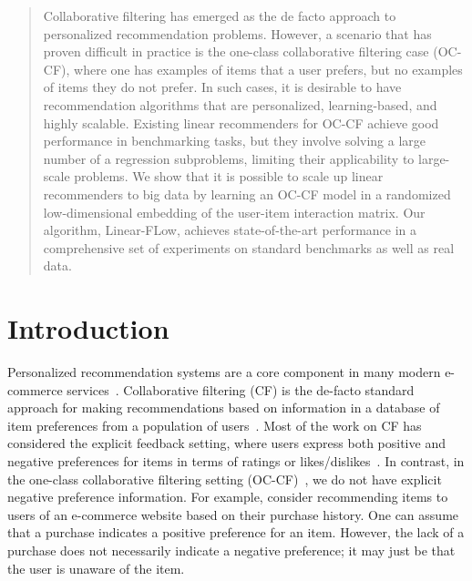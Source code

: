 \documentclass{article}
\newcommand{\citep}{\cite}
\begin{document}
\maketitle
\begin{abstract}
Collaborative filtering has emerged as the de facto approach to personalized recommendation problems. However, a scenario that has proven difficult in practice is the
one-class collaborative filtering case (OC-CF), where one has examples of items that a user prefers, but no examples of items they do not prefer. In such cases, it is desirable to have recommendation algorithms that are personalized, learning-based, and highly scalable. Existing linear recommenders for OC-CF achieve good performance in benchmarking tasks, but they involve solving a large number of a regression subproblems, limiting their applicability to large-scale problems. We show that it is possible to scale up linear recommenders to big data by learning an OC-CF model in a randomized low-dimensional embedding of the user-item interaction matrix. Our algorithm, Linear-FLow, achieves state-of-the-art performance in a comprehensive set of experiments on standard benchmarks as well as real data.

\end{abstract}



\section{Introduction}
Personalized recommendation systems are a core component
in many modern e-commerce services~\citep{Leavitt:2006}. Collaborative
filtering (CF) is the de-facto standard approach for making recommendations
based on information in a database
of item preferences from a population of users~\citep{Goldberg:1992,Sarwar:2001}. Most of the work on CF has considered
the explicit feedback
setting, where users express both positive and negative preferences
for items in terms of ratings or likes/dislikes~\citep{koren2009matrix}. In
contrast, in the one-class collaborative filtering setting (OC-CF)~\citep{Pan:2008}, we do not have
explicit negative preference information. For example, consider
recommending items to users of an e-commerce website
based on their purchase history. One can assume that a
purchase indicates a positive preference for an item. However,
the lack of a purchase does not necessarily indicate
a negative preference; it may just be that the user is unaware
of the item.
\end{document}
